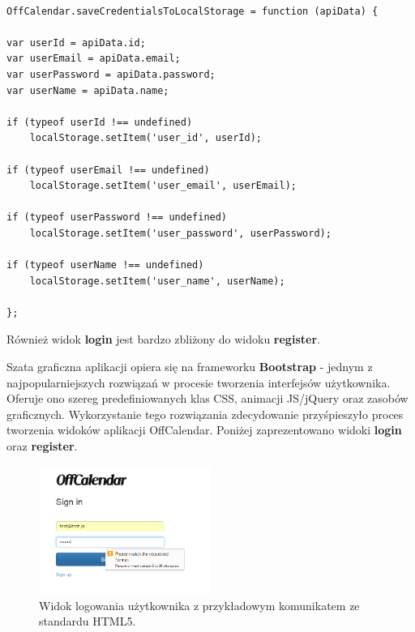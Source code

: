 \begin{lstlisting}[caption=Zapis danych logowania do obiektu localStorage w pamięci podręcznej przeglądarki., label=amb, captionpos=b]

OffCalendar.saveCredentialsToLocalStorage = function (apiData) {

var userId = apiData.id;
var userEmail = apiData.email;
var userPassword = apiData.password;
var userName = apiData.name;

if (typeof userId !== undefined)
    localStorage.setItem('user_id', userId);

if (typeof userEmail !== undefined)
    localStorage.setItem('user_email', userEmail);

if (typeof userPassword !== undefined)
    localStorage.setItem('user_password', userPassword);

if (typeof userName !== undefined)
    localStorage.setItem('user_name', userName);

};

\end{lstlisting}

Również widok \textbf{login} jest bardzo zbliżony do widoku \textbf{register}.

Szata graficzna aplikacji opiera się na frameworku \textbf{Bootstrap}\cite{bootstrap} - jednym z najpopularniejszych rozwiązań w procesie tworzenia interfejsów użytkownika. Oferuje ono szereg predefiniowanych klas CSS, animacji JS/jQuery oraz zasobów graficznych. Wykorzystanie tego rozwiązania zdecydowanie przyśpieszyło proces tworzenia widoków aplikacji OffCalendar. Poniżej zaprezentowano widoki \textbf{login} oraz \textbf{register}.

\begin{figure}[H]
\centering
\includegraphics[width=0.5\textwidth]{signin.png}
\caption{Widok logowania użytkownika z przykładowym komunikatem ze standardu HTML5.}
\end{figure}

